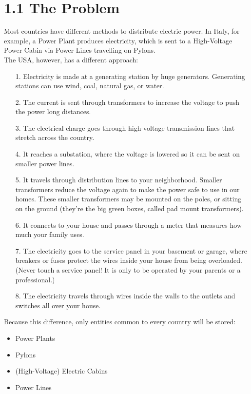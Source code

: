 \section*{1.1 \hspace{1cm} The Problem}
Most countries have different methods to distribute electric power. In Italy, for example, a Power Plant produces electricity, which is sent to a High-Voltage Power Cabin via Power Lines travelling on Pylons. \\
The USA, however, has a different approach:
\begin{itemize}
    \item[1.] Electricity is made at a generating station by huge generators. Generating stations can use wind, coal, natural gas, or water.
    \item[2.] The current is sent through transformers to increase the voltage to push the power long distances.
    \item[3.] The electrical charge goes through high-voltage transmission lines that stretch across the country.
    \item[4.] It reaches a substation, where the voltage is lowered so it can be sent on smaller power lines.
    \item[5.] It travels through distribution lines to your neighborhood. Smaller transformers reduce the voltage again to make the power safe to use in our homes. These smaller transformers may be mounted on the poles, or sitting on the ground (they’re the big green boxes, called pad mount transformers).
    \item[6.] It connects to your house and passes through a meter that measures how much your family uses.
    \item[7.] The electricity goes to the service panel in your basement or garage, where breakers or fuses protect the wires inside your house from being overloaded. (Never touch a service panel!  It is only to be operated by your parents or a professional.)
    \item[8.] The electricity travels through wires inside the walls to the outlets and switches all over your house.
\end{itemize}
Because this difference, only entities common to every country will be stored:
\begin{itemize}
    \item Power Plants
    \item Pylons
    \item (High-Voltage) Electric Cabins
    \item Power Lines
\end{itemize}

